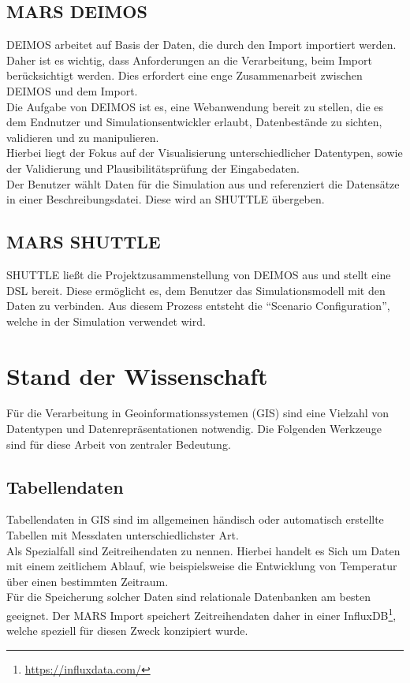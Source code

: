 \documentclass[10pt,conference,compsocconf]{IEEEtran}
\begin{document}
\subsection{MARS DEIMOS}
\label{sub:deimos}
DEIMOS arbeitet auf Basis der Daten, die durch den Import importiert werden. Daher ist es wichtig, dass Anforderungen an die Verarbeitung, beim Import berücksichtigt werden. Dies erfordert eine enge Zusammenarbeit zwischen DEIMOS und dem Import.\\
Die Aufgabe von DEIMOS ist es, eine Webanwendung bereit zu stellen, die es dem Endnutzer und Simulationsentwickler erlaubt, Datenbestände zu sichten, validieren und zu manipulieren.\\
Hierbei liegt der Fokus auf der Visualisierung unterschiedlicher Datentypen, sowie der Validierung und Plausibilitätsprüfung der Eingabedaten.\\
Der Benutzer wählt Daten für die Simulation aus und referenziert die Datensätze in einer Beschreibungsdatei. Diese wird an SHUTTLE übergeben.


\subsection{MARS SHUTTLE}
SHUTTLE ließt die Projektzusammenstellung von DEIMOS aus und stellt eine DSL bereit. Diese ermöglicht es, dem Benutzer das Simulationsmodell mit den Daten zu verbinden. Aus diesem Prozess entsteht die \enquote{Scenario Configuration}, welche in der Simulation verwendet wird.\\



\section{Stand der Wissenschaft}
Für die Verarbeitung in Geoinformationssystemen (GIS) sind eine Vielzahl von Datentypen und Datenrepräsentationen notwendig. Die Folgenden Werkzeuge sind für diese Arbeit von zentraler Bedeutung.


\subsection{Tabellendaten}
Tabellendaten in GIS sind im allgemeinen händisch oder automatisch erstellte Tabellen mit Messdaten unterschiedlichster Art. \\
Als Spezialfall sind Zeitreihendaten zu nennen. Hierbei handelt es Sich um Daten mit einem zeitlichem Ablauf, wie beispielsweise die Entwicklung von Temperatur über einen bestimmten Zeitraum.\\
Für die Speicherung solcher Daten sind relationale Datenbanken am besten geeignet. Der MARS Import speichert Zeitreihendaten daher in einer InfluxDB\footnote{\url{https://influxdata.com/}}, welche speziell für diesen Zweck konzipiert wurde.
\end{document}
